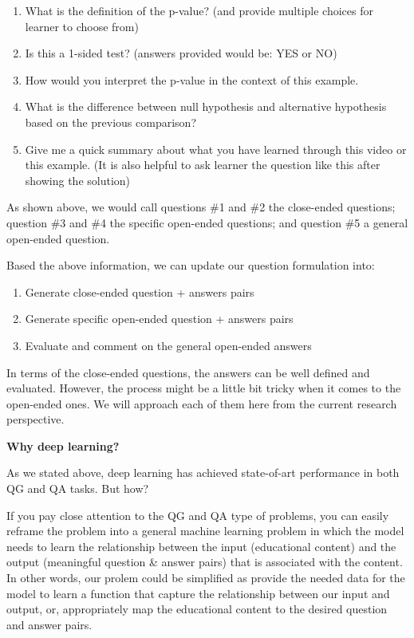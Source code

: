 \documentclass{acm_proc_article-sp}
\renewcommand{\paragraph}[1]{\vskip 6pt\noindent\textbf{#1 }}
\begin{document}
\begin{enumerate}
\def\labelenumi{\arabic{enumi}.}
\item
  What is the definition of the p-value? (and provide multiple choices
  for learner to choose from)
\item
  Is this a 1-sided test? (answers provided would be: YES or NO)
\item
  How would you interpret the p-value in the context of this example.
\item
  What is the difference between null hypothesis and alternative
  hypothesis based on the previous comparison?
\item
  Give me a quick summary about what you have learned through this video
  or this example. (It is also helpful to ask learner the question like
  this after showing the solution)
\end{enumerate}

As shown above, we would call questions \#1 and \#2 the close-ended
questions; question \#3 and \#4 the specific open-ended questions; and
question \#5 a general open-ended question.

Based the above information, we can update our question formulation
into:

\begin{enumerate}
\def\labelenumi{\arabic{enumi}.}
\item
  Generate close-ended question + answers pairs
\item
  Generate specific open-ended question + answers pairs
\item
  Evaluate and comment on the general open-ended answers
\end{enumerate}

In terms of the close-ended questions, the answers can be well defined
and evaluated. However, the process might be a little bit tricky when it
comes to the open-ended ones. We will approach each of them here from
the current research perspective.

\paragraph{Why deep learning?}\label{why-deep-learning}

As we stated above, deep learning has achieved state-of-art performance
in both QG and QA tasks. But how?

If you pay close attention to the QG and QA type of problems, you can
easily reframe the problem into a general machine learning problem in
which the model needs to learn the relationship between the input
(educational content) and the output (meaningful question \& answer
pairs) that is associated with the content. In other words, our prolem
could be simplified as provide the needed data for the model to learn a
function that capture the relationship between our input and output, or,
appropriately map the educational content to the desired question and
answer pairs.
\end{document}
